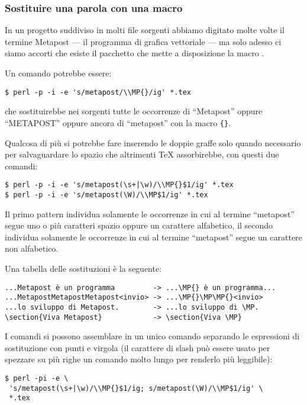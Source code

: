 \subsubsection{Sostituire una parola con una macro}

In un progetto suddiviso in molti file sorgenti abbiamo digitato molte volte il
termine Metapost --- il programma di grafica vettoriale --- ma solo adesso ci
siamo accorti che esiste il pacchetto  che mette a
disposizione la macro .

Un comando potrebbe essere:
\begin{verbatim}
$ perl -p -i -e 's/metapost/\\MP{}/ig' *.tex
\end{verbatim}
che sostituirebbe nei sorgenti tutte le occorrenze di ``Metapost'' oppure
``METAPOST'' oppure ancora di ``metapost'' con la macro \texttt{\{\}}.

Qualcosa di più si potrebbe fare inserendo le doppie graffe solo quando
necessario per salvaguardare lo spazio che altrimenti \TeX{} assorbirebbe, con
questi due comandi:
\begin{verbatim}
$ perl -p -i -e 's/metapost(\s+|\w)/\\MP{}$1/ig' *.tex
$ perl -p -i -e 's/metapost(\W)/\\MP$1/ig' *.tex
\end{verbatim}

Il primo pattern individua solamente le occorrenze in cui al termine
``metapost'' segue uno o più caratteri spazio oppure un carattere alfabetico,
il secondo individua solamente le occorrenze in cui al termine ``metapost''
segue un carattere non alfabetico.

Una tabella delle sostituzioni è la seguente:
\begin{Verbatim}[fontsize=\small]
...Metapost è un programma         -> ...\MP{} è un programma...
...MetapostMetapostMetapost<invio> -> ...\MP{}\MP\MP{}<invio>
...lo sviluppo di Metapost.        -> ...lo sviluppo di \MP.
\section{Viva Metapost}            -> \section{Viva \MP}
\end{Verbatim}

I comandi si possono assemblare in un unico comando separando le espressioni di
sostituzione con punti e virgola (il carattere di slash può essere usato per
spezzare su più righe un comando molto lungo per renderlo più leggibile):
\begin{verbatim}
$ perl -pi -e \
 's/metapost(\s+|\w)/\\MP{}$1/ig; s/metapost(\W)/\\MP$1/ig' \
 *.tex
\end{verbatim}

